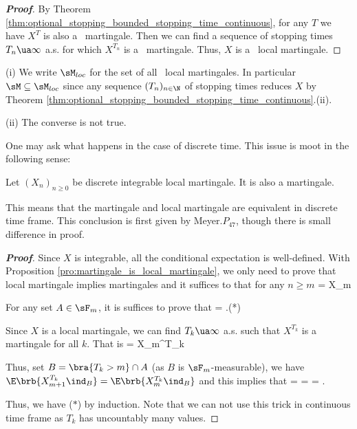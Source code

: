 \begin{proof}[\bf Proof]
By Theorem \ref{thm:optional_stopping_bounded_stopping_time_continuous}, for any $T$ we have $X^T$ is also a \cadlag\ martingale. Then we can find a sequence of stopping times $T_n \ua \infty$ a.s. for which $X^{T_n}$ is a \cadlag\ martingale. Thus, $X$ is a \cadlag\ local martingale.%
\end{proof}

\begin{remark}
\ben
\item [(i)] We write $\sM_{loc}$ for the set of all \cadlag\ local martingales. In particular $\sM\subseteq \sM_{loc}$ since any sequence $(T_n)_{n\in\N}$ of stopping times reduces $X$ by Theorem \ref{thm:optional_stopping_bounded_stopping_time_continuous}.(ii).
\item [(ii)] The converse is not true.
\een
\end{remark}

One may ask what happens in the case of discrete time. This issue is moot in the following sense:

\begin{proposition}
Let $(X_n)_{n\geq 0}$ be discrete integrable local martingale. It is also a martingale.
\end{proposition}

\begin{remark}
This means that the martingale and local martingale are equivalent in discrete time frame. This conclusion is first given by Meyer\cite{Meyer_1972}.$P_{47}$, though there is small difference in proof.
\end{remark}

\begin{proof}[\bf Proof]
Since $X$ is integrable, all the conditional expectation is well-defined. With Proposition \ref{pro:martingale_is_local_martingale}, we only need to prove that local martingale implies martingales and it suffices to that for any $n\geq m$
\be
\E{} = X_m 
\ee

For any set $A\in \sF_m$, it is suffices to prove that
\be
\E{} = \E{}.\quad\quad (*)
\ee

Since $X$ is a local martingale, we can find $T_k\ua \infty$ a.s. such that $X^{T_k}$ is a martingale for all $k$. That is
\be
\E{} = X_m^{T_k}
\ee

Thus, set $B = \bra{T_k > m}\cap A$ (as $B$ is $\sF_m$-measurable), we have $\E\brb{X_{m+1}^{T_k} \ind_B} = \E\brb{X_m^{T_k} \ind_B}$ and this implies that
\be
\E{} = \E{} = \E{} = \E{}.
\ee

Thus, we have ($*$) by induction. Note that we can not use this trick in continuous time frame as $T_k$ has uncountably many values.%
\end{proof}


